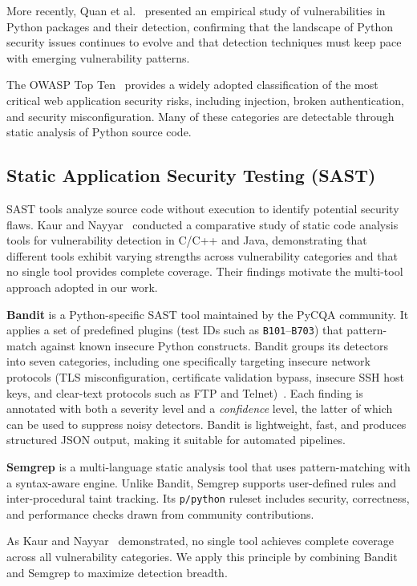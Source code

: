 \documentclass[sigconf,authordraft]{acmart}
\begin{document}
More recently, Quan et al.~\cite{Quan2025} presented an empirical
study of vulnerabilities in Python packages and their detection,
confirming that the landscape of Python security issues continues to
evolve and that detection techniques must keep pace with emerging
vulnerability patterns.

The OWASP Top Ten~\cite{OWASP2021} provides a widely adopted
classification of the most critical web application security risks,
including injection, broken authentication, and security
misconfiguration. Many of these categories are detectable through
static analysis of Python source code.

\subsection{Static Application Security Testing (SAST)}

SAST tools analyze source code without execution to identify
potential security flaws. Kaur and Nayyar~\cite{Kaur2020} conducted a
comparative study of static code analysis tools for vulnerability
detection in C/C++ and Java, demonstrating that different tools
exhibit varying strengths across vulnerability categories and that no
single tool provides complete coverage. Their findings motivate the
multi-tool approach adopted in our work.

\textbf{Bandit} is a Python-specific SAST tool maintained by the
PyCQA community. It applies a set of predefined plugins (test IDs
such as \texttt{B101}--\texttt{B703}) that pattern-match against known
insecure Python constructs. Bandit groups its detectors into seven
categories, including one specifically targeting insecure network
protocols (TLS misconfiguration, certificate validation bypass,
insecure SSH host keys, and clear-text protocols such as FTP and
Telnet)~\cite{Ruohonen2021}. Each finding is annotated with both a
severity level and a \emph{confidence} level, the latter of which can
be used to suppress noisy detectors. Bandit is lightweight, fast, and
produces structured JSON output, making it suitable for automated
pipelines.

\textbf{Semgrep} is a multi-language static analysis tool that uses
pattern-matching with a syntax-aware engine. Unlike Bandit, Semgrep
supports user-defined rules and inter-procedural taint tracking. Its
\texttt{p/python} ruleset includes security, correctness, and
performance checks drawn from community contributions.

As Kaur and Nayyar~\cite{Kaur2020} demonstrated, no single tool
achieves complete coverage across all vulnerability categories. We
apply this principle by combining Bandit and Semgrep to maximize
detection breadth.
\end{document}
